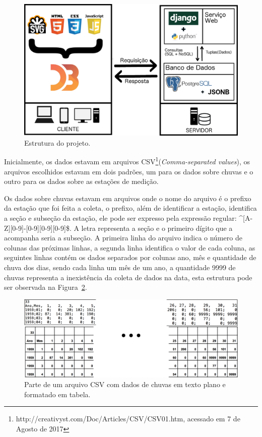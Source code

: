 \documentclass[article,11pt,oneside,a4paper]{abntex2} %
\begin{document}
	\begin{figure}[!h]
		\centering
		\includegraphics[width=1\textwidth]{figuras/ambiente3}
		\caption{Estrutura do projeto.}
		\label{ambiente}
	\end{figure}
	
	Inicialmente, os dados estavam em arquivos CSV\footnote{http://creativyst.com/Doc/Articles/CSV/CSV01.htm, acessado em 7 de Agosto de 2017}(\textit{Comma-separated values}), os arquivos escolhidos estavam em dois padrões, um para os dados sobre chuvas e o outro para os dados sobre as estações de medição.
	
	Os dados sobre chuvas estavam em arquivos onde o nome do arquivo é o prefixo da estação que foi feita a coleta, o prefixo, além de identificar a estação, identifica a seção e subseção da estação, ele pode ser expresso pela expressão regular: \^{}[A-Z][0-9]-[0-9][0-9][0-9]\$. A letra representa a seção e o primeiro dígito que a acompanha seria a subseção. A primeira linha do arquivo indica o número de colunas das próximas linhas, a segunda linha identifica o valor de cada coluna, as seguintes linhas contém os dados separados por colunas ano, mês e quantidade de chuva dos dias, sendo cada linha um mês de um ano, a quantidade 9999 de chuvas representa a inexistência da coleta de dados na data, esta estrutura pode ser observada na Figura~\ref{csv1}.
	
	\begin{figure}[!h]
		\centering
		\includegraphics[width=1\textwidth]{figuras/csv1_done3}
		\caption{Parte de um arquivo CSV com dados de chuvas em texto plano e formatado em tabela.}
		\label{csv1}
	\end{figure}
\end{document}
